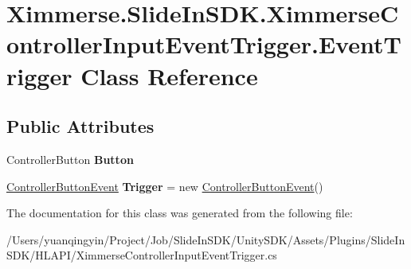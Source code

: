 \hypertarget{class_ximmerse_1_1_slide_in_s_d_k_1_1_ximmerse_controller_input_event_trigger_1_1_event_trigger}{}\section{Ximmerse.\+Slide\+In\+S\+D\+K.\+Ximmerse\+Controller\+Input\+Event\+Trigger.\+Event\+Trigger Class Reference}
\label{class_ximmerse_1_1_slide_in_s_d_k_1_1_ximmerse_controller_input_event_trigger_1_1_event_trigger}
\subsection*{Public Attributes}
\begin{DoxyCompactItemize}
\item 
\mbox{\label{class_ximmerse_1_1_slide_in_s_d_k_1_1_ximmerse_controller_input_event_trigger_1_1_event_trigger_a61f7a8b83a48fe56f9775bc07b59b543}} 
Controller\+Button {\bfseries Button}
\item 
\mbox{\label{class_ximmerse_1_1_slide_in_s_d_k_1_1_ximmerse_controller_input_event_trigger_1_1_event_trigger_a688568d901a20cfdaf866e723970e79a}} 
\mbox{\hyperlink{class_ximmerse_1_1_slide_in_s_d_k_1_1_ximmerse_controller_input_event_trigger_1_1_controller_button_event}{Controller\+Button\+Event}} {\bfseries Trigger} = new \mbox{\hyperlink{class_ximmerse_1_1_slide_in_s_d_k_1_1_ximmerse_controller_input_event_trigger_1_1_controller_button_event}{Controller\+Button\+Event}}()
\end{DoxyCompactItemize}


The documentation for this class was generated from the following file\+:\begin{DoxyCompactItemize}
\item 
/\+Users/yuanqingyin/\+Project/\+Job/\+Slide\+In\+S\+D\+K/\+Unity\+S\+D\+K/\+Assets/\+Plugins/\+Slide\+In\+S\+D\+K/\+H\+L\+A\+P\+I/Ximmerse\+Controller\+Input\+Event\+Trigger.\+cs\end{DoxyCompactItemize}
